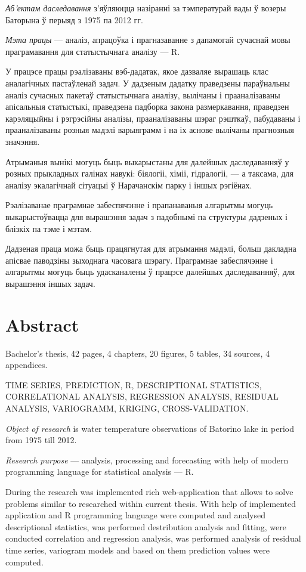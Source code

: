 \textit{Аб'ектам даследавання} з'яўляюцца назіранні за тэмпературай вады ў возеры Баторына ў перыяд з 1975 па 2012 гг.

\textit{Мэта працы} --- аналіз, апрацоўка і прагназаванне з дапамогай сучаснай мовы праграмавання для статыстычнага аналізу --- R.

У працэсе працы рэалізаваны вэб-дадатак, якое дазваляе вырашаць клас аналагічных пастаўленай задач. У дадзеным дадатку праведзены параўнальны аналіз сучасных пакетаў статыстычнага аналізу, вылічаны і прааналізаваны апісальныя статыстыкі, праведзена падборка закона размеркавання, праведзен карэляцыйны і рэгрэсійны аналізы, прааналізаваны шэраг рэшткаў, пабудаваны і прааналізаваны розныя мадэлі варыяграмм і на іх аснове вылічаны прагнозныя значэння.

Атрыманыя вынікі могуць быць выкарыстаны для далейшых даследаванняў у розных прыкладных галінах навукі: біялогіі, хіміі, гідралогіі, --- а таксама, для аналізу экалагічнай сітуацыі ў Нарачанскім парку і іншых рэгіёнах.

Рэалізаванае праграмнае забеспячэнне і прапанаваныя алгарытмы могуць выкарыстоўвацца для вырашэння задач з падобнымі па структуры дадзеных і блізкіх па тэме і мэтам.

Дадзеная праца можа быць працягнутая для атрымання мадэлі, больш дакладна апісвае паводзіны зыходнага часовага шэрагу. Праграмнае забеспячэнне і алгарытмы могуць быць удасканалены ў працэсе далейшых даследаванняў, для вырашэння іншых задач.

\newpage

\chapter*{Abstract}
Bachelor's thesis, 42 pages, 4 chapters, 20 figures, 5 tables, 34 sources, 4 appendices.

TIME SERIES, PREDICTION, R, DESCRIPTIONAL STATISTICS, CORRELATIONAL ANALYSIS, REGRESSION ANALYSIS, RESIDUAL ANALYSIS, VARIOGRAMM, KRIGING, CROSS-VALIDATION.

\textit{Object of research} is water temperature observations of Batorino lake in period from 1975 till 2012.

\textit{Research purpose} --- analysis, processing and forecasting with help of modern programming language for statistical analysis --- R.

During the research was implemented rich web-application that allows to solve problems similar to researched within current thesis. With help of implemented application and R programming language were computed and analysed descriptional statistics, was performed destribution analysis and fitting, were conducted correlation and regression analysis, was performed analysis of residual time series, variogram models and based on them prediction values were computed.


